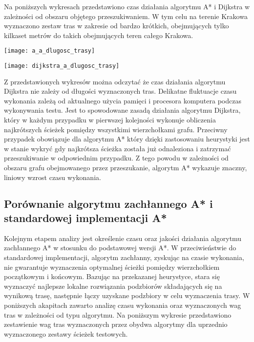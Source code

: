 Na poniższych wykresach przedstawiono czas działania algorytmu A* i Dijkstra w zależności od obszaru objętego przeszukiwaniem. W tym celu na terenie Krakowa wyznaczono zestaw tras w zakresie od bardzo krótkich, obejmujących tylko kilkaset metrów do takich obejmujących teren całego Krakowa.

\begin{center}
\texttt{[image: a\_a\_dlugosc\_trasy]}
\end{center}

\begin{center}
\texttt{[image: dijkstra\_a\_dlugosc\_trasy]}
\end{center}

Z przedstawionych wykresów można odczytać że czas działania algorytmu Dijkstra nie zależy od długości wyznaczonych tras. Delikatne fluktuacje czasu wykonania zależą od aktualnego użycia pamięci i procesora komputera podczas wykonywania testu. Jest to spowodowane zasadą działania algorytmu Dijkstra, który w każdym przypadku w pierwszej kolejności wykonuje obliczenia najkrótszych ścieżek pomiędzy wszystkimi wierzchołkami grafu.
Przeciwny przypadek obowiązuje dla algorytmu A* który dzięki zastosowaniu heurystyki jest w stanie wykryć gdy najkrótsza ścieżka została już odnaleziona i zatrzymać przeszukiwanie w odpowiednim przypadku. Z tego powodu w zależności od obszaru grafu obejmowanego przez przeszukanie, algorytm A* wykazuje znaczny, liniowy wzrost czasu wykonania.

\subsection{Porównanie algorytmu zachłannego A* i standardowej implementacji A*}

Kolejnym etapem analizy jest określenie czasu oraz jakości działania algorytmu zachłannego A* w stosunku do podstawowej wersji A*. W przeciwieństwie do standardowej implementacji, algorytm zachłanny, zyskując na czasie wykonania, nie gwarantuje wyznaczenia optymalnej ścieżki pomiędzy wierzchołkiem początkowym i końcowym. Bazując na przekazanej heurystyce, stara się wyznaczyć najlepsze lokalne rozwiązania podzbiorów składających się na wynikową trasę, następnie łączy uzyskane podzbiory w celu wyznaczenia trasy. W poniższych akapitach zawarto analizę czasu wykonania oraz wyznaczonych wag tras w zależności od typu algorytmu.
Na poniższym wykresie przedstawiono zestawienie wag tras wyznaczonych przez obydwa algorytmy dla uprzednio wyznaczonego zestawy ścieżek testowych.

